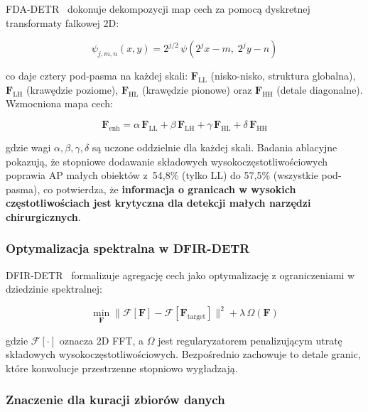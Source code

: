 FDA-DETR~\cite{fda_detr2025} dokonuje dekompozycji map cech za pomocą
dyskretnej transformaty falkowej 2D:

\begin{equation}
    \psi_{j,m,n}(x,y) = 2^{j/2}\,\psi(2^j x - m,\; 2^j y - n)
\end{equation}

co daje cztery pod-pasma na każdej skali: $\mathbf{F}_{\text{LL}}$
(nisko-nisko, struktura globalna), $\mathbf{F}_{\text{LH}}$ (krawędzie
poziome), $\mathbf{F}_{\text{HL}}$ (krawędzie pionowe) oraz
$\mathbf{F}_{\text{HH}}$ (detale diagonalne).  Wzmocniona mapa cech:

\begin{equation}
    \mathbf{F}_{\text{enh}} = \alpha\,\mathbf{F}_{\text{LL}}
                            + \beta\,\mathbf{F}_{\text{LH}}
                            + \gamma\,\mathbf{F}_{\text{HL}}
                            + \delta\,\mathbf{F}_{\text{HH}}
\end{equation}

gdzie wagi $\alpha, \beta, \gamma, \delta$ są uczone oddzielnie dla każdej
skali.  Badania ablacyjne pokazują, że stopniowe dodawanie składowych
wysokoczęstotliwościowych poprawia AP małych obiektów z~54{,}8\%
(tylko LL) do 57{,}5\% (wszystkie pod-pasma), co potwierdza, że
\textbf{informacja o granicach w wysokich częstotliwościach jest krytyczna
dla detekcji małych narzędzi chirurgicznych}.

\subsubsection{Optymalizacja spektralna w DFIR-DETR}

DFIR-DETR~\cite{dfir_detr2025} formalizuje agregację cech jako optymalizację
z ograniczeniami w dziedzinie spektralnej:

\begin{equation}
    \min_{\mathbf{F}}
    \|\mathcal{F}[\mathbf{F}] - \mathcal{F}[\mathbf{F}_{\text{target}}]\|^2
    + \lambda\,\Omega(\mathbf{F})
\end{equation}

gdzie $\mathcal{F}[\cdot]$ oznacza 2D FFT, a $\Omega$ jest regularyzatorem
penalizującym utratę składowych wysokoczęstotliwościowych.  Bezpośrednio
zachowuje to detale granic, które konwolucje przestrzenne stopniowo wygładzają.

\subsubsection{Znaczenie dla kuracji zbiorów danych}

